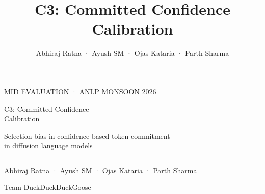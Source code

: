 \documentclass[aspectratio=169,10pt,t]{beamer}
\title{C3: Committed Confidence Calibration}
\author{Abhiraj Ratna · Ayush SM · Ojas Kataria · Parth Sharma}
\begin{document}
\begin{frame}[c,plain]
  \hspace*{4mm}\begin{minipage}{0.9\linewidth}\raggedright
    {\color{accent}\fontsize{9.5}{12}\selectfont\firasemibold MID EVALUATION · ANLP MONSOON 2026}\par
    \vspace{4mm}
    {\fontsize{24}{28}\selectfont\firasemibold C3: Committed Confidence\\[1mm] Calibration}\par
    \vspace{3mm}
    {\color{ink2}\large Selection bias in confidence-based token commitment\\[0.6mm]
      in diffusion language models}\par
    \vspace{5mm}
    {\color{accent}\rule{14mm}{1.6pt}}\par
    \vspace{5mm}
    {\normalsize Abhiraj Ratna · Ayush SM · Ojas Kataria · Parth Sharma}\par
    \vspace{1.2mm}
    {\small\color{ink2}Team DuckDuckDuckGoose}
  \end{minipage}
\end{frame}
\end{document}

